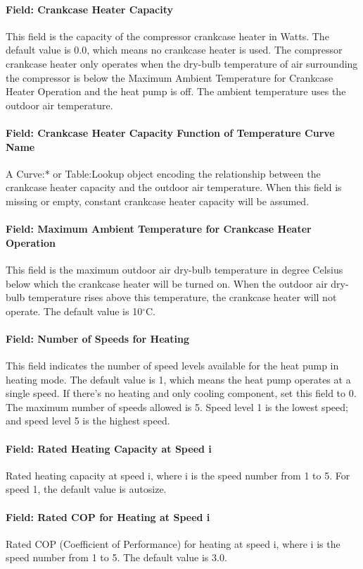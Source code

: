\paragraph{Field: Crankcase Heater Capacity} This field is the capacity of the
compressor crankcase heater in Watts. The default value is 0.0, which means no
crankcase heater is used. The compressor crankcase heater only operates when the
dry-bulb temperature of air surrounding the compressor is below the Maximum
Ambient Temperature for Crankcase Heater Operation and the heat pump is off. The
ambient temperature uses the outdoor air temperature.
\paragraph{Field: Crankcase Heater Capacity Function of Temperature Curve Name}
A Curve:* or Table:Lookup object encoding the relationship between the crankcase
heater capacity and the outdoor air temperature. When this field is missing or
empty, constant crankcase heater capacity will be assumed.
\paragraph{Field: Maximum Ambient Temperature for Crankcase Heater Operation}
This field is the maximum outdoor air dry-bulb temperature in degree Celsius
below which the crankcase heater will be turned on. When the outdoor air dry-bulb
temperature rises above this temperature, the crankcase heater will not operate.
The default value is 10$^\circ$C.
\paragraph{Field: Number of Speeds for Heating} This field indicates the number
of speed levels available for the heat pump in heating mode. The default value
is 1, which means the heat pump operates at a single speed. If there's no
heating and only cooling component, set this field to 0. The maximum number of
speeds allowed is 5. Speed level 1 is the lowest speed; and speed level 5 is
the highest speed.
\paragraph{Field: Rated Heating Capacity at Speed i} Rated heating capacity at
speed i, where i is the speed number from 1 to 5. For speed 1, the default value
is autosize.
\paragraph{Field: Rated COP for Heating at Speed i} Rated COP (Coefficient of
Performance) for heating at speed i, where i is the speed number from 1 to 5.
The default value is 3.0.
